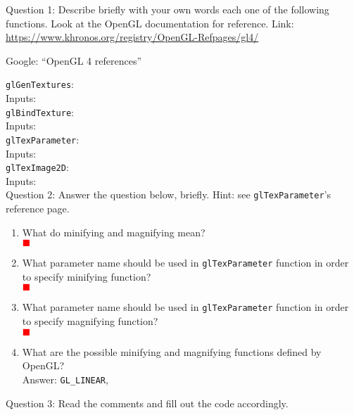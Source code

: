 \documentclass[12pt]{article}
\newcommand{\TODO}{\textcolor{red}{$\blacksquare$}}
\newcommand{\TODOL}[1]{\textcolor{red}{\underline{\hspace{#1 cm}}}}
\begin{document}
Question 1: Describe briefly with your own words each one of the following
functions. Look at the OpenGL documentation for reference.  Link:
\href{https://www.khronos.org/registry/OpenGL-Refpages/gl4/}{https://www.khronos.org/registry/OpenGL-Refpages/gl4/}

Google: ``OpenGL 4 references''

\texttt{glGenTextures}:\\[1em]
Inputs: \TODOL6\\[1em]
\texttt{glBindTexture}:\\[1em]
Inputs: \TODOL6\\[1em]
\texttt{glTexParameter}:\\[1em]
Inputs: \TODOL6\\[1em]
\texttt{glTexImage2D}:\\[1em]
Inputs: \TODOL6\\

Question 2: Answer the question below, briefly. Hint: see \texttt{glTexParameter}'s
reference page.

\begin{enumerate}
\item What do minifying and magnifying mean?\\[1em] \TODO
\item What parameter name should be used in \texttt{glTexParameter} function in
  order to specify minifying function?\\[1em] \TODO
\item What parameter name should be used in \texttt{glTexParameter} function in
  order to specify magnifying function?\\[1em] \TODO
\item What are the possible minifying and magnifying functions defined by
  OpenGL?\\[1em]
  Answer: \texttt{GL\_LINEAR}, \TODOL6
\end{enumerate}
\pagebreak
Question 3: Read the comments and fill out the code accordingly. 
\end{document}
